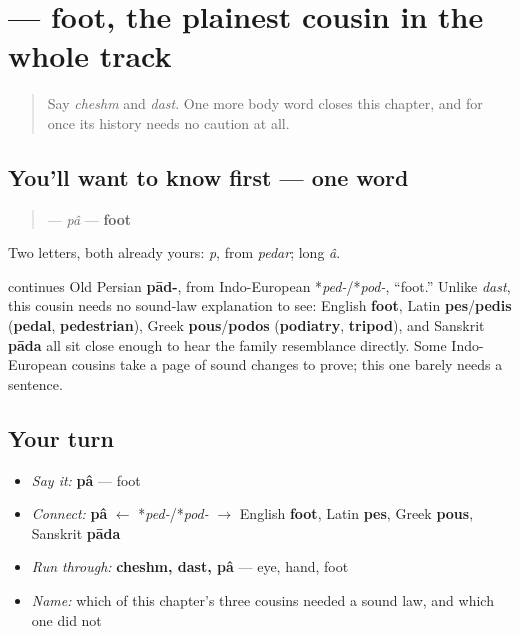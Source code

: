 \section[\texorpdfstring{\fa{پا} (pâ)}{پا (pâ)}]{ — foot, the plainest cousin in the whole track}

\label{lesson:FA-C11-pa}



\begin{quote}
Say \emph{cheshm} and \emph{dast}. One more body word closes this chapter, and for once its history needs no caution at all.
\end{quote}

\subsection*{You'll want to know first — one word}
\begin{quote}
\textbf{} — \emph{pâ} — \textbf{foot}
\end{quote}

Two letters, both already yours: \textbf{} \emph{p}, from \emph{pedar}; long \textbf{} \emph{â}.

\begin{cousinweb}
\textbf{} continues Old Persian \textbf{pād-}, from Indo-European *\emph{ped-}/*\emph{pod-}, “foot.” Unlike \emph{dast}, this cousin needs no sound-law explanation to see: English \textbf{foot}, Latin \textbf{pes}/\textbf{pedis} (\textbf{pedal}, \textbf{pedestrian}), Greek \textbf{pous}/\textbf{podos} (\textbf{podiatry}, \textbf{tripod}), and Sanskrit \textbf{pāda} all sit close enough to hear the family resemblance directly. Some Indo-European cousins take a page of sound changes to prove; this one barely needs a sentence.
\end{cousinweb}

\subsection*{Your turn}
\begin{itemize}
\raggedright
  \item \emph{Say it:} \textbf{pâ} — foot
  \item \emph{Connect:} \textbf{pâ} $\leftarrow$ *\emph{ped-}/*\emph{pod-} $\to$ English \textbf{foot}, Latin \textbf{pes}, Greek \textbf{pous}, Sanskrit \textbf{pāda}
  \item \emph{Run through:} \textbf{cheshm, dast, pâ} — eye, hand, foot
  \item \emph{Name:} which of this chapter's three cousins needed a sound law, and which one did not
\end{itemize}

